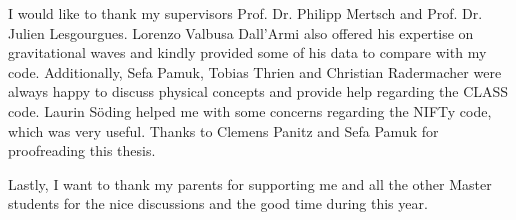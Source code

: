 I would like to thank my supervisors Prof. Dr. Philipp Mertsch and Prof. Dr. Julien Lesgourgues. Lorenzo Valbusa Dall'Armi also offered his expertise on gravitational waves and kindly provided some of his data to compare with my code. Additionally, Sefa Pamuk, Tobias Thrien and Christian Radermacher were always happy to discuss physical concepts and provide help regarding the CLASS code. Laurin Söding helped me with some concerns regarding the NIFTy code, which was very useful. Thanks to Clemens Panitz and Sefa Pamuk for proofreading this thesis. 

Lastly, I want to thank my parents for supporting me and all the other Master students for the nice discussions and the good time during this year.
